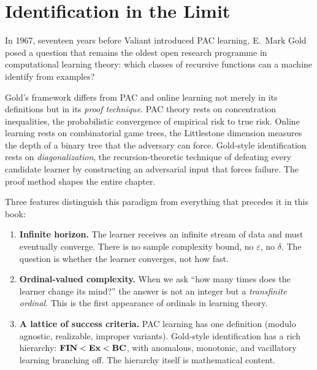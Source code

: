 
%

\chapter{Identification in the Limit}
\label{ch:gold}

In 1967, seventeen years before Valiant introduced PAC learning, E.\ Mark Gold posed a question that remains the oldest open research programme in computational learning theory: which classes of recursive functions can a machine identify from examples?

Gold's framework differs from PAC and online learning not merely in its definitions but in its \emph{proof technique}. PAC theory rests on concentration inequalities, the probabilistic convergence of empirical risk to true risk. Online learning rests on combinatorial game trees, the Littlestone dimension measures the depth of a binary tree that the adversary can force. Gold-style identification rests on \emph{diagonalization}, the recursion-theoretic technique of defeating every candidate learner by constructing an adversarial input that forces failure. The proof method shapes the entire chapter.

Three features distinguish this paradigm from everything that precedes it in this book:

\begin{enumerate}[leftmargin=*,itemsep=3pt]
\item \textbf{Infinite horizon.} The learner receives an infinite stream of data and must eventually converge. There is no sample complexity bound, no $\varepsilon$, no $\delta$. The question is whether the learner converges, not how fast.

\item \textbf{Ordinal-valued complexity.} When we ask ``how many times does the learner change its mind?'' the answer is not an integer but a \emph{transfinite ordinal}. This is the first appearance of ordinals in learning theory.

\item \textbf{A lattice of success criteria.} PAC learning has one definition (modulo agnostic, realizable, improper variants). Gold-style identification has a rich hierarchy: $\mathbf{FIN} < \mathbf{Ex} < \mathbf{BC}$, with anomalous, monotonic, and vacillatory learning branching off. The hierarchy itself is mathematical content.
\end{enumerate}

